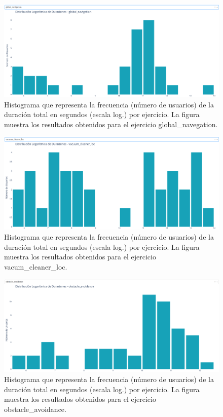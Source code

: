 \documentclass[a4paper, 12pt]{book}
\begin{document}
\begin{figure}[H]
  \centering
  \includegraphics[width=1.1\textwidth]{img/3aa.png}
  \caption{Histograma que representa la frecuencia (número de usuarios) de la duración total en segundos (escala log.) por ejercicio. La figura muestra los resultados obtenidos para el ejercicio global\_navegation.}
  \label{fig:3aa}
\end{figure}

\begin{figure}[H]
  \centering
  \includegraphics[width=1.1\textwidth]{img/3aaa.png}
  \caption{Histograma que representa la frecuencia (número de usuarios) de la duración total en segundos (escala log.) por ejercicio. La figura muestra los resultados obtenidos para el ejercicio vacum\_cleaner\_loc.}
  \label{fig:3aaa}
\end{figure}

\begin{figure}[H]
  \centering
  \includegraphics[width=1.1\textwidth]{img/3aaaa.png}
  \caption{Histograma que representa la frecuencia (número de usuarios) de la duración total en segundos (escala log.) por ejercicio. La figura muestra los resultados obtenidos para el ejercicio obstacle\_avoidance.}
  \label{fig:3aaaa}
\end{figure}
\end{document}

